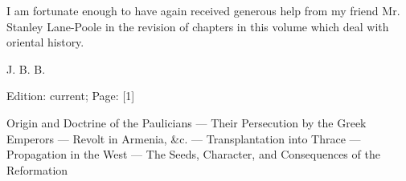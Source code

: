 
I am fortunate enough to have again received generous help from my friend Mr. Stanley Lane-Poole in the revision of chapters in this volume which deal with oriental history.

J. B. B.

Edition: current; Page: [1]



Origin and Doctrine of the Paulicians \texthebrew{—} Their Persecution by the Greek Emperors \texthebrew{—} Revolt in Armenia, \&c. \texthebrew{—} Transplantation into Thrace \texthebrew{—} Propagation in the West \texthebrew{—} The Seeds, Character, and Consequences of the Reformation

